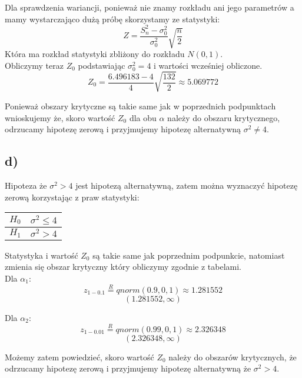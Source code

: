 \documentclass{article}
\begin{document}
Dla sprawdzenia wariancji, ponieważ nie znamy rozkładu ani jego parametrów a mamy wystarczająco dużą próbę skorzystamy ze statystyki:
\[ Z = \frac{S_n^2-\sigma_0^2}{\sigma_0^2} \sqrt{\frac{n}{2}} \]
Która ma rozkład statystyki zbliżony do rozkładu $N(0,1)$. \\
Obliczymy teraz $Z_0$ podstawiając $\sigma^2_0 = 4$ i wartości wcześniej obliczone.
\[ Z_0 = \frac{6.496183 - 4}{4} \sqrt{\frac{132}{2}} \approx 5.069772 \]

Ponieważ obszary krytyczne są takie same jak w poprzednich podpunktach wnioskujemy że, skoro wartość $Z_0$ dla obu $\alpha$ należy do obszaru krytycznego, odrzucamy hipotezę zerową i przyjmujemy hipotezę alternatywną $\sigma^2 \neq 4$.

\subsection{d)}
Hipoteza że $\sigma^2 > 4$ jest hipotezą alternatywną, zatem można wyznaczyć hipotezę zerową korzystając z praw statystyki:
\begin{center} \begin{tabular}{|c|c|} \hline
$H_0$ & $\sigma^2 \leq 4$ \\ \hline
$H_1$ & $\sigma^2 > 4$ \\ \hline
\end{tabular} \end{center}

Statystyka i wartość $Z_0$ są takie same jak poprzednim podpunkcie, natomiast zmienia się obszar krytyczny który obliczymy zgodnie z tabelami.\\
Dla $\alpha_1$:
\[z_{1 - 0.1} \overset{R}{=} qnorm(0.9, 0, 1) \approx 1.281552 \]
\[ (1.281552, \infty) \]

Dla $\alpha_2$:
\[z_{1 - 0.01} \overset{R}{=} qnorm(0.99, 0, 1) \approx 2.326348 \]
\[ (2.326348, \infty) \]

Możemy zatem powiedzieć, skoro wartość $Z_0$ należy do obszarów krytycznych, że odrzucamy hipotezę zerową i przyjmujemy hipotezę alternatywną że $\sigma^2 > 4$.
\end{document}
